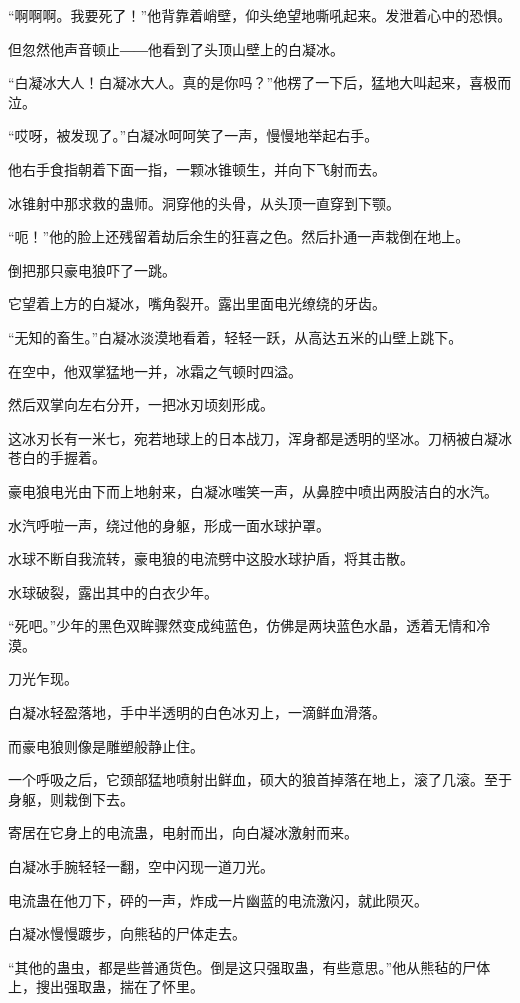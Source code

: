 \begin{this_body}
“啊啊啊。我要死了！”他背靠着峭壁，仰头绝望地嘶吼起来。发泄着心中的恐惧。

但忽然他声音顿止――他看到了头顶山壁上的白凝冰。

“白凝冰大人！白凝冰大人。真的是你吗？”他楞了一下后，猛地大叫起来，喜极而泣。

“哎呀，被发现了。”白凝冰呵呵笑了一声，慢慢地举起右手。

他右手食指朝着下面一指，一颗冰锥顿生，并向下飞射而去。

冰锥射中那求救的蛊师。洞穿他的头骨，从头顶一直穿到下颚。

“呃！”他的脸上还残留着劫后余生的狂喜之色。然后扑通一声栽倒在地上。

倒把那只豪电狼吓了一跳。

它望着上方的白凝冰，嘴角裂开。露出里面电光缭绕的牙齿。

“无知的畜生。”白凝冰淡漠地看着，轻轻一跃，从高达五米的山壁上跳下。

在空中，他双掌猛地一并，冰霜之气顿时四溢。

然后双掌向左右分开，一把冰刃顷刻形成。

这冰刃长有一米七，宛若地球上的日本战刀，浑身都是透明的坚冰。刀柄被白凝冰苍白的手握着。

豪电狼电光由下而上地射来，白凝冰嗤笑一声，从鼻腔中喷出两股洁白的水汽。

水汽呼啦一声，绕过他的身躯，形成一面水球护罩。

水球不断自我流转，豪电狼的电流劈中这股水球护盾，将其击散。

水球破裂，露出其中的白衣少年。

“死吧。”少年的黑色双眸骤然变成纯蓝色，仿佛是两块蓝色水晶，透着无情和冷漠。

刀光乍现。

白凝冰轻盈落地，手中半透明的白色冰刃上，一滴鲜血滑落。

而豪电狼则像是雕塑般静止住。

一个呼吸之后，它颈部猛地喷射出鲜血，硕大的狼首掉落在地上，滚了几滚。至于身躯，则栽倒下去。

寄居在它身上的电流蛊，电射而出，向白凝冰激射而来。

白凝冰手腕轻轻一翻，空中闪现一道刀光。

电流蛊在他刀下，砰的一声，炸成一片幽蓝的电流激闪，就此陨灭。

白凝冰慢慢踱步，向熊毡的尸体走去。

“其他的蛊虫，都是些普通货色。倒是这只强取蛊，有些意思。”他从熊毡的尸体上，搜出强取蛊，揣在了怀里。


\end{this_body}
